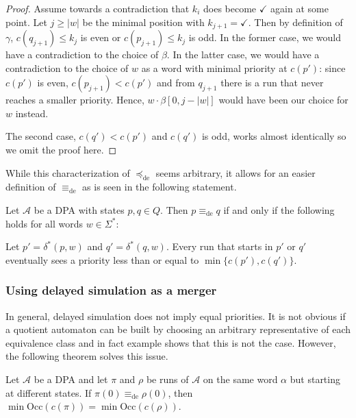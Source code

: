 \begin{proof}
	Assume towards a contradiction that $k_i$ does become $\checkmark$ again at some point. Let $j \geq |w|$ be the minimal position with $k_{j+1} = \checkmark$. Then by definition of $\gamma$, $c(q_{j+1}) \leq k_j$ is even or $c(p_{j+1}) \leq k_j$ is odd. In the former case, we would have a contradiction to the choice of $\beta$. In the latter case, we would have a contradiction to the choice of $w$ as a word with minimal priority at $c(p')$: since $c(p')$ is even, $c(p_{j+1}) < c(p')$ and from $q_{j+1}$ there is a run that never reaches a smaller priority. Hence, $w \cdot \beta[0, j-|w|]$ would have been our choice for $w$ instead.
	
	The second case, $c(q') < c(p')$ and $c(q')$ is odd, works almost identically so we omit the proof here.
\end{proof}

While this characterization of $\preceq_\text{de}$ seems arbitrary, it allows for an easier definition of $\equiv_\text{de}$ as is seen in the following statement.

\begin{cor}
\label{cor:fritzwilke:equivde_alternative}
	Let $\mathcal{A}$ be a DPA with states $p, q \in Q$. Then $p \equiv_\text{de} q$ if and only if the following holds for all words $w \in \Sigma^*$:
	
	Let $p' = \delta^*(p, w)$ and $q' = \delta^*(q, w)$. Every run that starts in $p'$ or $q'$ eventually sees a priority less than or equal to $\min \{c(p'), c(q')\}$.
\end{cor}



\vspace{1cm}
\subsubsection*{Using delayed simulation as a merger}
In general, delayed simulation does not imply equal priorities. It is not obvious if a quotient automaton can be built by choosing an arbitrary representative of each equivalence class and in fact example %
shows that this is not the case. However, the following theorem solves this issue.

\begin{lem}
\label{lem:fritzwilke:equiv_states_same_minpri}
	Let $\mathcal{A}$ be a DPA and let $\pi$ and $\rho$ be runs of $\mathcal{A}$ on the same word $\alpha$ but starting at different states. If $\pi(0) \equiv_\text{de} \rho(0)$, then $\min \text{Occ}(c(\pi)) = \min \text{Occ}(c(\rho))$.
\end{lem}

